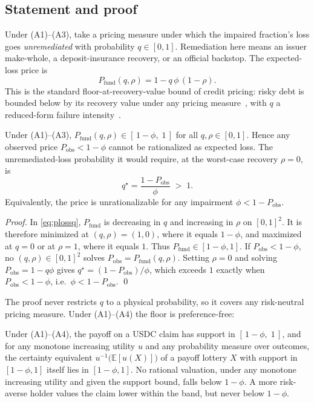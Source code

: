 \subsection{Statement and proof}
Under (A1)--(A3), take a pricing measure under which the impaired fraction's loss goes
\emph{unremediated} with probability $q\in[0,1]$. Remediation here means an issuer
make-whole, a deposit-insurance recovery, or an official backstop. The expected-loss price is
\begin{equation}
P_{\mathrm{fund}}(q,\rho) = 1 - q\,\phi\,(1-\rho).
\label{eq:plossq}
\end{equation}
This is the standard floor-at-recovery-value bound of credit pricing: risky debt is bounded
below by its recovery value under any pricing measure~\cite{merton1974}, with $q$ a
reduced-form failure intensity~\cite{duffiesingleton1999}.

\begin{proposition}
\label{prop:floor}
Under \textup{(A1)--(A3)}, $P_{\mathrm{fund}}(q,\rho)\in[\,1-\phi,\;1\,]$ for all
$q,\rho\in[0,1]$. Hence any observed price $P_{\mathrm{obs}}<1-\phi$ cannot be rationalized as
expected loss. The unremediated-loss probability it would require, at the worst-case recovery
$\rho=0$, is
\begin{equation}
q^\star = \frac{1-P_{\mathrm{obs}}}{\phi} \;>\;1 .
\end{equation}
Equivalently, the price is unrationalizable for any impairment $\phi<1-P_{\mathrm{obs}}$.
\end{proposition}

\begin{proof}
In \eqref{eq:plossq}, $P_{\mathrm{fund}}$ is decreasing in $q$ and increasing in $\rho$ on
$[0,1]^2$. It is therefore minimized at $(q,\rho)=(1,0)$, where it equals $1-\phi$, and
maximized at $q=0$ or at $\rho=1$, where it equals $1$. Thus $P_{\mathrm{fund}}\in[1-\phi,1]$.
If $P_{\mathrm{obs}}<1-\phi$,
no $(q,\rho)\in[0,1]^2$ solves $P_{\mathrm{obs}}=P_{\mathrm{fund}}(q,\rho)$. Setting $\rho=0$
and solving $P_{\mathrm{obs}}=1-q\phi$ gives $q^\star=(1-P_{\mathrm{obs}})/\phi$, which
exceeds $1$ exactly when $P_{\mathrm{obs}}<1-\phi$, i.e.\ $\phi<1-P_{\mathrm{obs}}$. \qed
\end{proof}

The proof never restricts $q$ to a physical probability, so it covers any
risk-neutral pricing measure. Under \textup{(A1)--(A4)} the floor is preference-free:

\begin{corollary}
\label{cor:fosd}
Under \textup{(A1)--(A4)}, the payoff on a USDC claim has support in $[\,1-\phi,\;1\,]$, and
for any monotone increasing utility $u$ and any probability measure over outcomes, the
certainty equivalent $u^{-1}\!\bigl(\mathbb{E}[u(X)]\bigr)$ of a payoff lottery $X$ with
support in $[1-\phi,1]$ itself lies in $[1-\phi,1]$. No rational valuation, under any
monotone increasing utility and given the support bound, falls below $1-\phi$. A more
risk-averse holder values the claim lower within the band, but never below $1-\phi$.
\end{corollary}

